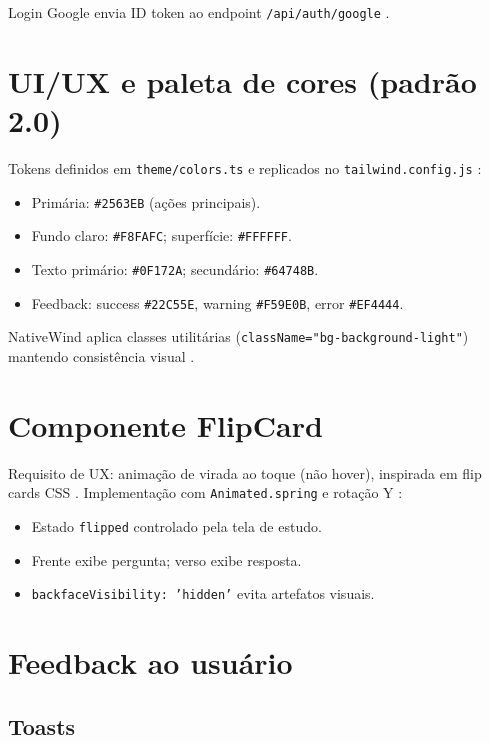 Login Google envia ID token ao endpoint \texttt{/api/auth/google} \cite{google_oauth}.

\section{UI/UX e paleta de cores (padrão 2.0)}

Tokens definidos em \texttt{theme/colors.ts} e replicados no \texttt{tailwind.config.js} \cite{tailwind_docs}:

\begin{itemize}
    \item Primária: \texttt{\#2563EB} (ações principais).
    \item Fundo claro: \texttt{\#F8FAFC}; superfície: \texttt{\#FFFFFF}.
    \item Texto primário: \texttt{\#0F172A}; secundário: \texttt{\#64748B}.
    \item Feedback: success \texttt{\#22C55E}, warning \texttt{\#F59E0B}, error \texttt{\#EF4444}.
\end{itemize}

NativeWind aplica classes utilitárias (\texttt{className="bg-background-light"}) mantendo consistência visual \cite{nativewind_docs}.

\section{Componente FlipCard}

Requisito de UX: animação de virada ao toque (não hover), inspirada em flip cards CSS \cite{w3schools_flip}. Implementação com \texttt{Animated.spring} e rotação Y \cite{reanimated_docs}:

\begin{itemize}
    \item Estado \texttt{flipped} controlado pela tela de estudo.
    \item Frente exibe pergunta; verso exibe resposta.
    \item \texttt{backfaceVisibility: 'hidden'} evita artefatos visuais.
\end{itemize}

\section{Feedback ao usuário}

\subsection{Toasts}

